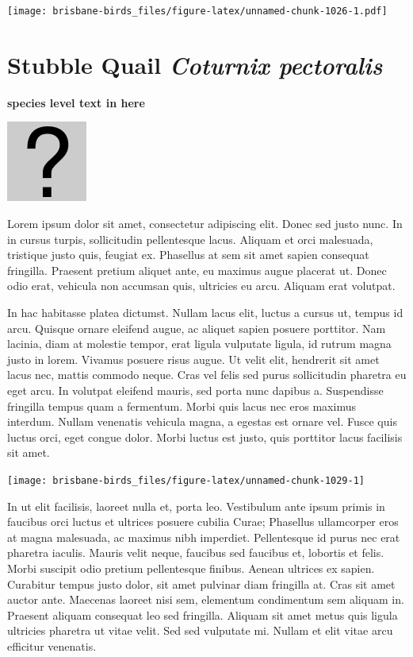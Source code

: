 \documentclass[]{book}
\let\origfigure\figure
\let\endorigfigure\endfigure
\renewenvironment{figure}[1][2] {
  \expandafter\origfigure\expandafter[H]
} {
  \endorigfigure
}
\begin{document}
\texttt{[image: brisbane-birds\_files/figure-latex/unnamed-chunk-1026-1.pdf]}

\section{\texorpdfstring{Stubble Quail \emph{Coturnix
pectoralis}}{Stubble Quail Coturnix pectoralis}}\label{stubble-quail-coturnix-pectoralis}

\textbf{species level text in here}

\begin{figure}
\centering
\includegraphics{assets/missing.png}
\caption{No image for species}
\end{figure}

Lorem ipsum dolor sit amet, consectetur adipiscing elit. Donec sed justo
nunc. In in cursus turpis, sollicitudin pellentesque lacus. Aliquam et
orci malesuada, tristique justo quis, feugiat ex. Phasellus at sem sit
amet sapien consequat fringilla. Praesent pretium aliquet ante, eu
maximus augue placerat ut. Donec odio erat, vehicula non accumsan quis,
ultricies eu arcu. Aliquam erat volutpat.

In hac habitasse platea dictumst. Nullam lacus elit, luctus a cursus ut,
tempus id arcu. Quisque ornare eleifend augue, ac aliquet sapien posuere
porttitor. Nam lacinia, diam at molestie tempor, erat ligula vulputate
ligula, id rutrum magna justo in lorem. Vivamus posuere risus augue. Ut
velit elit, hendrerit sit amet lacus nec, mattis commodo neque. Cras vel
felis sed purus sollicitudin pharetra eu eget arcu. In volutpat eleifend
mauris, sed porta nunc dapibus a. Suspendisse fringilla tempus quam a
fermentum. Morbi quis lacus nec eros maximus interdum. Nullam venenatis
vehicula magna, a egestas est ornare vel. Fusce quis luctus orci, eget
congue dolor. Morbi luctus est justo, quis porttitor lacus facilisis sit
amet.

\begin{figure}
\texttt{[image: brisbane-birds\_files/figure-latex/unnamed-chunk-1029-1]} \caption{insert figure caption}\label{fig:unnamed-chunk-1029}
\end{figure}

In ut elit facilisis, laoreet nulla et, porta leo. Vestibulum ante ipsum
primis in faucibus orci luctus et ultrices posuere cubilia Curae;
Phasellus ullamcorper eros at magna malesuada, ac maximus nibh
imperdiet. Pellentesque id purus nec erat pharetra iaculis. Mauris velit
neque, faucibus sed faucibus et, lobortis et felis. Morbi suscipit odio
pretium pellentesque finibus. Aenean ultrices ex sapien. Curabitur
tempus justo dolor, sit amet pulvinar diam fringilla at. Cras sit amet
auctor ante. Maecenas laoreet nisi sem, elementum condimentum sem
aliquam in. Praesent aliquam consequat leo sed fringilla. Aliquam sit
amet metus quis ligula ultricies pharetra ut vitae velit. Sed sed
vulputate mi. Nullam et elit vitae arcu efficitur venenatis.
\end{document}
